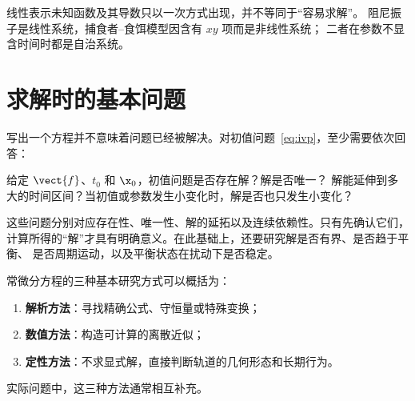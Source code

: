 线性表示未知函数及其导数只以一次方式出现，并不等同于“容易求解”。
阻尼振子是线性系统，捕食者--食饵模型因含有 $xy$ 项而是非线性系统；
二者在参数不显含时间时都是自治系统。

\section{求解时的基本问题}

写出一个方程并不意味着问题已经被解决。对初值问题~\eqref{eq:ivp}，至少需要依次回答：

\begin{problem}
给定 $\vect{f}$、$t_0$ 和 $\x_0$，初值问题是否存在解？解是否唯一？
解能延伸到多大的时间区间？当初值或参数发生小变化时，解是否也只发生小变化？
\end{problem}

这些问题分别对应存在性、唯一性、解的延拓以及连续依赖性。只有先确认它们，
计算所得的“解”才具有明确意义。在此基础上，还要研究解是否有界、是否趋于平衡、
是否周期运动，以及平衡状态在扰动下是否稳定。


常微分方程的三种基本研究方式可以概括为：
\begin{enumerate}
	\item \textbf{解析方法}：寻找精确公式、守恒量或特殊变换；
	\item \textbf{数值方法}：构造可计算的离散近似；
	\item \textbf{定性方法}：不求显式解，直接判断轨道的几何形态和长期行为。
\end{enumerate}
实际问题中，这三种方法通常相互补充。



